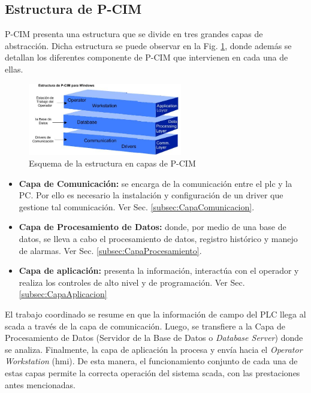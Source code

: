 \subsection{Estructura de P-CIM}
\label{sec:CapasPrograma}
P-CIM presenta una estructura que se divide en tres grandes capas de 
abstracción. Dicha estructura se puede observar en la 
Fig. \ref{fig:estructuraSCADA}, donde además se detallan los diferentes
componente de P-CIM que intervienen en cada una de ellas.
\begin{figure}[ht!]
\centering
	\includegraphics[width=0.6\textwidth]
	{Cap5-SCADA/images/estructura.jpeg}
	\caption{Esquema de la estructura en capas de P-CIM}
	\label{fig:estructuraSCADA}
\end{figure}

\begin{itemize}
 \item \textbf{Capa de Comunicación:} se encarga de la comunicación entre el
\gls{plc} y
 la PC. Por ello es necesario la instalación y configuración de un driver que 
 gestione tal comunicación. Ver Sec. \ref{subsec:CapaComunicacion}.
 \item \textbf{Capa de Procesamiento de Datos:} donde, por medio de una base de
datos, se
lleva a cabo el procesamiento de datos, registro histórico y manejo de alarmas. 
Ver Sec. \ref{subsec:CapaProcesamiento}.
 \item \textbf{Capa de aplicación:} presenta la información, interactúa con el
operador
  y realiza los controles de alto nivel y de programación. Ver 
Sec. \ref{subsec:CapaAplicacion}
\end{itemize}

El trabajo coordinado se resume en que la información de campo del PLC llega al 
\gls{scada} a través de la capa de comunicación.
Luego, se transfiere a la Capa de Procesamiento de Datos (Servidor de la Base de
Datos o \emph{Database Server}) donde se analiza.
Finalmente, la capa de aplicación la procesa y envía hacia el \emph{Operator
Workstation} (\gls{hmi}). De esta manera, el funcionamiento conjunto de cada
una de
estas capas permite la correcta operación del sistema \gls{scada}, con
las prestaciones antes mencionadas.


